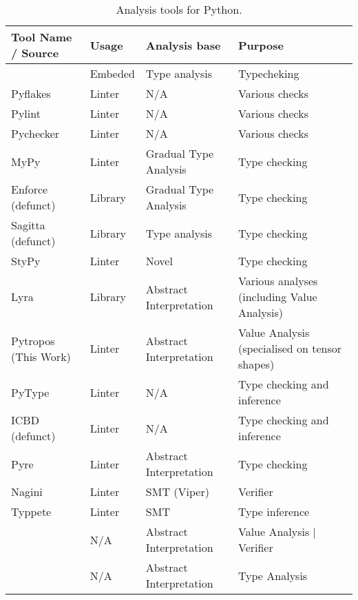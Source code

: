 \begin{sidewaystable}[p]
\centering
\begin{threeparttable}
\begin{longtable}[]{|l|l|l|l|}
  \caption{Analysis tools for Python.
  }\label{relatedworktable}\tabularnewline
  \toprule
  Tool Name / Source & Usage & Analysis base & Purpose \tabularnewline
  \midrule
  \endhead
    \textcite{cannon_localized_2005}                     & Embeded & Type analysis           & Typecheking     \tabularnewline
    Pyflakes \autocite{pyflakes2005}                     & Linter  & N/A                     & Various checks  \tabularnewline
    Pylint \autocite{thenaultpylint}                     & Linter  & N/A                     & Various checks  \tabularnewline
    Pychecker \autocite{norwitzpychecker}                & Linter  & N/A                     & Various checks  \tabularnewline
    MyPy \autocite{lehtosalo2016mypy}                    & Linter  & Gradual Type Analysis   & Type checking   \tabularnewline
    Enforce\tnote{1}\tnote{+} (defunct)                  & Library & Gradual Type Analysis   & Type checking               \tabularnewline
    Sagitta\tnote{2}\tnote{+} (defunct)                  & Library & Type analysis           & Type checking               \tabularnewline
    StyPy \autocite{ortin_towards_2015}                  & Linter  & Novel                   & Type checking               \tabularnewline
    Lyra\tnote{3}                                        & Library & Abstract Interpretation & Various analyses (including Value Analysis) \tabularnewline
    Pytropos\tnote{4} (This Work)                        & Linter  & Abstract Interpretation & Value Analysis (specialised on tensor shapes) \tabularnewline
    PyType\tnote{5}                                      & Linter  & N/A                     & Type checking and inference \tabularnewline
    ICBD\tnote{6} (defunct)                              & Linter  & N/A                     & Type checking and inference \tabularnewline
    Pyre\tnote{7}                                        & Linter  & Abstract Interpretation & Type checking               \tabularnewline
    Nagini\tnote{8} \autocite{eilers_nagini_2018}        & Linter  & SMT (Viper)             & Verifier                    \tabularnewline
    Typpete\tnote{9} \autocite{hassan_maxsmt-based_2018} & Linter  & SMT                     & Type inference              \tabularnewline
    \textcite{fromherz_static_2018}\tnote{*}             & N/A     & Abstract Interpretation & Value Analysis | Verifier   \tabularnewline
    \textcite{monat_static_2018}\tnote{*}                & N/A     & Abstract Interpretation & Type Analysis               \tabularnewline

\end{longtable}
\end{threeparttable}
\end{sidewaystable}
